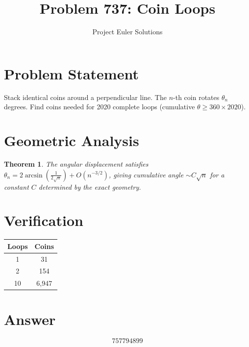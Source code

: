 \documentclass[11pt]{article}
\title{Problem 737: Coin Loops}
\author{Project Euler Solutions}
\date{}
\newtheorem{theorem}{Theorem}
\begin{document}
\maketitle


\section{Problem Statement}
Stack identical coins around a perpendicular line. The $n$-th coin rotates $\theta_n$ degrees. Find coins needed for 2020 complete loops (cumulative $\theta \ge 360 \times 2020$).

\section{Geometric Analysis}
\begin{theorem}
The angular displacement satisfies $\theta_n = 2\arcsin\!\left(\frac{1}{2\sqrt{n}}\right) + O(n^{-3/2})$, giving cumulative angle $\sim C\sqrt{n}$ for a constant $C$ determined by the exact geometry.
\end{theorem}

\section{Verification}
\begin{center}
\begin{tabular}{cc}
\toprule
Loops & Coins \\
\midrule
1 & 31 \\
2 & 154 \\
10 & 6,947 \\
\bottomrule
\end{tabular}
\end{center}

\section{Answer}

\[
\boxed{757794899}
\]
\end{document}
